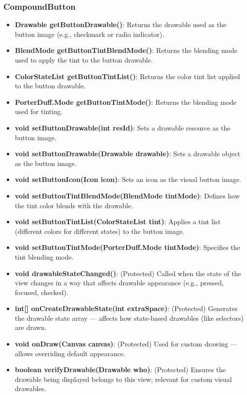 \documentclass{report}
\begin{document}
\begin{itemize}
    \subsubsection{CompoundButton}
    \begin{itemize}
        \item \textbf{Drawable getButtonDrawable()}: Returns the drawable used as the button image (e.g., checkmark or radio indicator).
        \item \textbf{BlendMode getButtonTintBlendMode()}: Returns the blending mode used to apply the tint to the button drawable.
        \item \textbf{ColorStateList getButtonTintList()}: Returns the color tint list applied to the button drawable.
        \item \textbf{PorterDuff.Mode getButtonTintMode()}: Returns the blending mode used for tinting.
        \item \textbf{void setButtonDrawable(int resId)}: Sets a drawable resource as the button image.
        \item \textbf{void setButtonDrawable(Drawable drawable)}: Sets a drawable object as the button image.
        \item \textbf{void setButtonIcon(Icon icon)}: Sets an icon as the visual button image.
        \item \textbf{void setButtonTintBlendMode(BlendMode tintMode)}: Defines how the tint color blends with the drawable.
        \item \textbf{void setButtonTintList(ColorStateList tint)}: Applies a tint list (different colors for different states) to the button image.
        \item \textbf{void setButtonTintMode(PorterDuff.Mode tintMode)}: Specifies the tint blending mode.
        \item \textbf{void drawableStateChanged()}: (Protected) Called when the state of the view changes in a way that affects drawable appearance (e.g., pressed, focused, checked).
        \item \textbf{int[] onCreateDrawableState(int extraSpace)}: (Protected) Generates the drawable state array — affects how state-based drawables (like selectors) are drawn.
        \item \textbf{void onDraw(Canvas canvas)}: (Protected) Used for custom drawing — allows overriding default appearance.
        \item \textbf{boolean verifyDrawable(Drawable who)}: (Protected) Ensures the drawable being displayed belongs to this view; relevant for custom visual drawables.
    \end{itemize}


\end{itemize}
\end{document}
